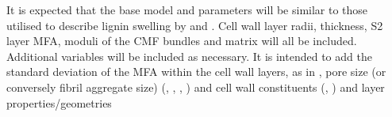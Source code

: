 It is expected that the base model and parameters will be similar to those
utilised to describe lignin swelling by \cite{Alm_ras_2005} and \cite{Yamamoto_1998}. Cell wall layer radii, thickness, S2 layer MFA, moduli of the CMF bundles and matrix will all be included. Additional variables will be included
as necessary. It is intended to add the standard deviation of the MFA within the
cell wall layers, as in \cite{Harrington_1998}, pore size (or conversely fibril
aggregate size) (\cite{Fahl_n_2005}, \cite{Chang_2014}, \cite{BIORESBioRes_07_1_0521_Salmen_OSSR_Struc_Organis_Wood_Polymers}, \cite{Kim_2011}) and cell wall
constituents (\cite{Baba_2009}, \cite{Donaldson_2001}) and layer properties/geometries
